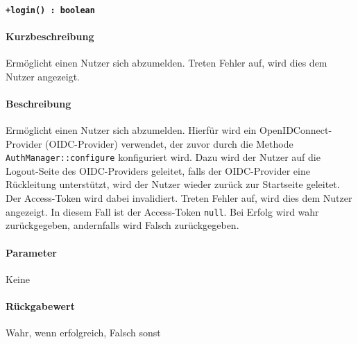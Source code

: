 \paragraph{\texttt{+login() : boolean}}%
\paragraph*{Kurzbeschreibung}
Ermöglicht einen Nutzer sich abzumelden.
Treten Fehler auf, wird dies dem Nutzer angezeigt.
\paragraph*{Beschreibung}
Ermöglicht einen Nutzer sich abzumelden.
Hierfür wird ein OpenIDConnect-Provider (OIDC-Provider) verwendet, der zuvor durch die Methode \verb#AuthManager::configure# konfiguriert wird.
Dazu wird der Nutzer auf die Logout-Seite des OIDC-Providers geleitet, falls der OIDC-Provider eine Rückleitung unterstützt, wird der Nutzer wieder zurück zur Startseite geleitet.
Der Access-Token wird dabei invalidiert.
Treten Fehler auf, wird dies dem Nutzer angezeigt. In diesem Fall ist der Access-Token \verb#null#.
Bei Erfolg wird wahr zurückgegeben, andernfalls wird Falsch zurückgegeben.
\paragraph*{Parameter}
Keine
\paragraph*{Rückgabewert}
Wahr, wenn erfolgreich, Falsch sonst
